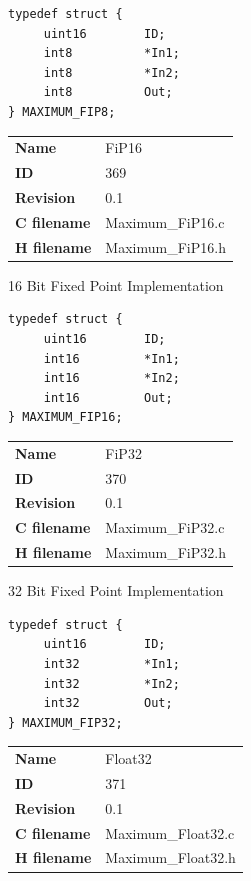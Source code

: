 \begin{lstlisting}
typedef struct {
     uint16        ID;
     int8          *In1;
     int8          *In2;
     int8          Out;
} MAXIMUM_FIP8;
\end{lstlisting}

\ifdefined \AddTestReports
{}
\fi
{}
\nopagebreak[0]
\begin{tabular}{l l}
\textbf{Name} & FiP16 \tabularnewline
\textbf{ID} & 369 \tabularnewline
\textbf{Revision} & 0.1 \tabularnewline
\textbf{C filename} & Maximum\_FiP16.c \tabularnewline
\textbf{H filename} & Maximum\_FiP16.h \tabularnewline
\end{tabular}
\vspace{1ex}

16 Bit Fixed Point Implementation

\begin{lstlisting}
typedef struct {
     uint16        ID;
     int16         *In1;
     int16         *In2;
     int16         Out;
} MAXIMUM_FIP16;
\end{lstlisting}

\ifdefined \AddTestReports
{}
\fi
{}
\nopagebreak[0]
\begin{tabular}{l l}
\textbf{Name} & FiP32 \tabularnewline
\textbf{ID} & 370 \tabularnewline
\textbf{Revision} & 0.1 \tabularnewline
\textbf{C filename} & Maximum\_FiP32.c \tabularnewline
\textbf{H filename} & Maximum\_FiP32.h \tabularnewline
\end{tabular}
\vspace{1ex}

32 Bit Fixed Point Implementation

\begin{lstlisting}
typedef struct {
     uint16        ID;
     int32         *In1;
     int32         *In2;
     int32         Out;
} MAXIMUM_FIP32;
\end{lstlisting}

\ifdefined \AddTestReports
{}
\fi
{}
\nopagebreak[0]
\begin{tabular}{l l}
\textbf{Name} & Float32 \tabularnewline
\textbf{ID} & 371 \tabularnewline
\textbf{Revision} & 0.1 \tabularnewline
\textbf{C filename} & Maximum\_Float32.c \tabularnewline
\textbf{H filename} & Maximum\_Float32.h \tabularnewline
\end{tabular}
\vspace{1ex}

